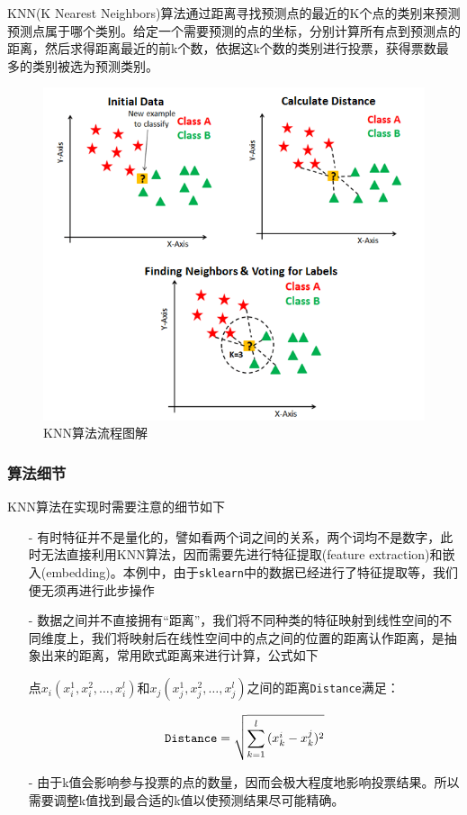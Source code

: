 \documentclass[utf-8]{article}
\begin{document}
KNN(K Nearest Neighbors)算法通过距离寻找预测点的最近的K个点的类别来预测预测点属于哪个类别。给定一个需要预测的点的坐标，分别计算所有点到预测点的距离，然后求得距离最近的前k个数，依据这k个数的类别进行投票，获得票数最多的类别被选为预测类别。

\begin{figure}[!h]
\centering
\includegraphics[scale=0.5]{./KNN_model.png}
\caption{KNN算法流程图解}
\label{fig:1}
\end{figure}

\subsubsection{算法细节}

KNN算法在实现时需要注意的细节如下

\begin{itemize}
	\item [-] 有时特征并不是量化的，譬如看两个词之间的关系，两个词均不是数字，此时无法直接利用KNN算法，因而需要先进行特征提取(feature extraction)和嵌入(embedding)。本例中，由于\verb|sklearn|中的数据已经进行了特征提取等，我们便无须再进行此步操作
	\item [-] 数据之间并不直接拥有“距离”，我们将不同种类的特征映射到线性空间的不同维度上，我们将映射后在线性空间中的点之间的位置的距离认作距离，是抽象出来的距离，常用欧式距离来进行计算，公式如下
	\begin{center}
		点$x_i(x^1_i,x^2_i,\ldots,x^l_i)$和$x_j(x^1_j,x^2_j,\ldots,x^l_j)$之间的距离\verb|Distance|满足：
	\end{center}
	\[\verb|Distance|=\sqrt{\sum_{k=1}^l{(x_k^i-x_k^j)^2}}\]
	\item [-] 由于k值会影响参与投票的点的数量，因而会极大程度地影响投票结果。所以需要调整k值找到最合适的k值以使预测结果尽可能精确。
\end{itemize}
\end{document}
